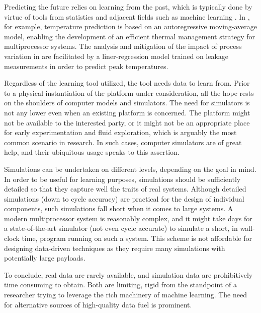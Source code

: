 Predicting the future relies on learning from the past, which is typically done
by virtue of tools from statistics and adjacent fields such as machine learning
\cite{bishop2006}. In \cite{coskun2008}, for example, temperature prediction is
based on an autoregressive moving-average model, enabling the development of an
efficient thermal management strategy for multiprocessor systems. The analysis
and mitigation of the impact of process variation in \cite{juan2014} are
facilitated by a liner-regression model trained on leakage measurements in order
to predict peak temperatures.

Regardless of the learning tool utilized, the tool needs data to learn from.
Prior to a physical instantiation of the platform under consideration, all the
hope rests on the shoulders of computer models and simulators. The need for
simulators is not any lower even when an existing platform is concerned. The
platform might not be available to the interested party, or it might not be an
appropriate place for early experimentation and fluid exploration, which is
arguably the most common scenario in research. In such cases, computer
simulators are of great help, and their ubiquitous usage speaks to this
assertion.

Simulations can be undertaken on different levels, depending on the goal in
mind. In order to be useful for learning purposes, simulations should be
sufficiently detailed so that they capture well the traits of real systems.
Although detailed simulations (down to cycle accuracy) are practical for the
design of individual components, such simulations fall short when it comes to
large systems. A modern multiprocessor system is reasonably complex, and it
might take days for a state-of-the-art simulator (not even cycle accurate) to
simulate a short, in wall-clock time, program running on such a system. This
scheme is not affordable for designing data-driven techniques as they require
many simulations with potentially large payloads.

To conclude, real data are rarely available, and simulation data are
prohibitively time consuming to obtain. Both are limiting, rigid from the
standpoint of a researcher trying to leverage the rich machinery of machine
learning. The need for alternative sources of high-quality data fuel is
prominent.
